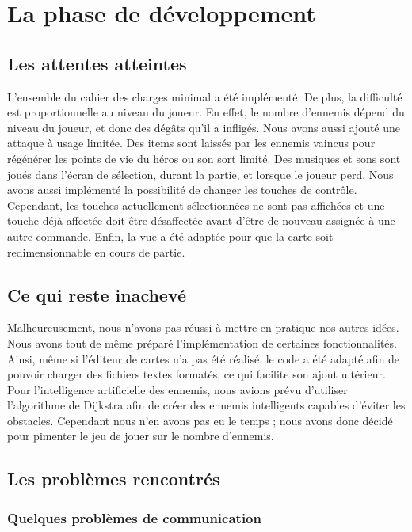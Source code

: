 \section{La phase de développement}

\subsection{Les attentes atteintes}

L'ensemble du cahier des charges minimal a été implémenté. De plus, la difficulté est proportionnelle au niveau du joueur. En effet, le nombre d'ennemis dépend du niveau du joueur, et donc des dégâts qu'il a infligés. Nous avons aussi ajouté une attaque à usage limitée. Des items sont laissés par les ennemis vaincus pour régénérer les points de vie du héros ou son sort limité. Des musiques et sons sont joués dans l'écran de sélection, durant la partie, et lorsque le joueur perd. Nous avons aussi implémenté la possibilité de changer les touches de contrôle. Cependant, les touches actuellement sélectionnées ne sont pas affichées et une touche déjà affectée doit être désaffectée avant d'être de nouveau assignée à une autre commande. Enfin, la vue a été adaptée pour que la carte soit redimensionnable en cours de partie. 

\subsection{Ce qui reste inachevé}

Malheureusement, nous n'avons pas réussi à mettre en pratique nos autres idées. Nous avons tout de même préparé l'implémentation de certaines fonctionnalités. Ainsi, même si l'éditeur de cartes n'a pas été réalisé, le code a été adapté afin de pouvoir charger des fichiers textes formatés, ce qui facilite son ajout ultérieur. \\
Pour l'intelligence artificielle des ennemis, nous avions prévu d'utiliser l'algorithme de Dijkstra afin de créer des ennemis intelligents capables d'éviter les obstacles. Cependant nous n'en avons pas eu le temps ; nous avons donc décidé pour pimenter le jeu de jouer sur le nombre d'ennemis.

\subsection{Les problèmes rencontrés}

	\subsubsection{Quelques problèmes de communication}
 
